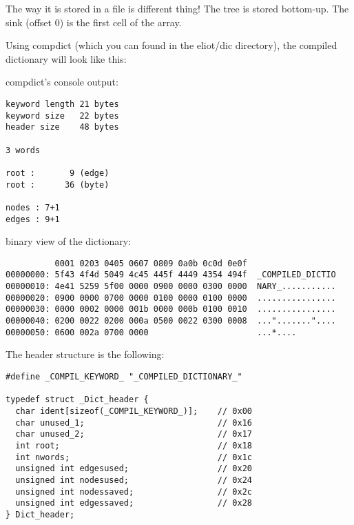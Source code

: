 \documentclass[dvips]{article}
\begin{document}
 The way it is stored in a file is  different thing! The tree is
 stored bottom-up. The sink (offset 0) is the first cell of
 the array.

 Using compdict (which you can found in the eliot/dic directory),
 the compiled dictionary will look like this:

compdict's console output:

\begin{small}
\begin{verbatim}
keyword length 21 bytes
keyword size   22 bytes
header size    48 bytes

3 words

root :       9 (edge)
root :      36 (byte)

nodes : 7+1
edges : 9+1
\end{verbatim}
\end{small}

binary view of the dictionary:

\begin{small}
\begin{verbatim}
          0001 0203 0405 0607 0809 0a0b 0c0d 0e0f
00000000: 5f43 4f4d 5049 4c45 445f 4449 4354 494f  _COMPILED_DICTIO
00000010: 4e41 5259 5f00 0000 0900 0000 0300 0000  NARY_...........
00000020: 0900 0000 0700 0000 0100 0000 0100 0000  ................
00000030: 0000 0002 0000 001b 0000 000b 0100 0010  ................
00000040: 0200 0022 0200 000a 0500 0022 0300 0008  ..."......."....
00000050: 0600 002a 0700 0000                      ...*....
\end{verbatim} 
\end{small}

The header structure is the following:

\begin{small}
\begin{verbatim}
#define _COMPIL_KEYWORD_ "_COMPILED_DICTIONARY_"

typedef struct _Dict_header {
  char ident[sizeof(_COMPIL_KEYWORD_)];    // 0x00
  char unused_1;                           // 0x16
  char unused_2;                           // 0x17
  int root;                                // 0x18
  int nwords;                              // 0x1c
  unsigned int edgesused;                  // 0x20
  unsigned int nodesused;                  // 0x24
  unsigned int nodessaved;                 // 0x2c
  unsigned int edgessaved;                 // 0x28
} Dict_header;
\end{verbatim}
\end{small}
\end{document}
